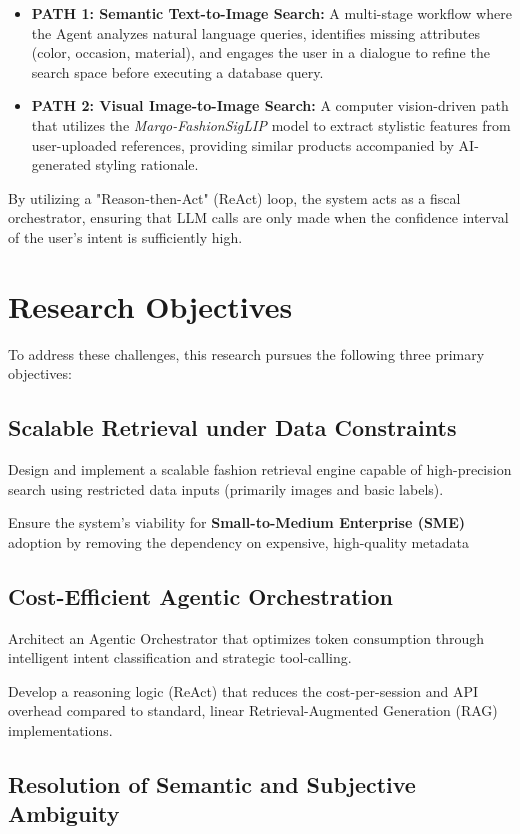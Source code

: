 \begin{itemize}
    \item \textbf{PATH 1: Semantic Text-to-Image Search:} A multi-stage workflow where the Agent analyzes natural language queries, identifies missing attributes (color, occasion, material), and engages the user in a dialogue to refine the search space before executing a database query.
    \item \textbf{PATH 2: Visual Image-to-Image Search:} A computer vision-driven path that utilizes the \textit{Marqo-FashionSigLIP} model to extract stylistic features from user-uploaded references, providing similar products accompanied by AI-generated styling rationale.
\end{itemize}

By utilizing a "Reason-then-Act" (ReAct) loop, the system acts as a fiscal orchestrator, ensuring that LLM calls are only made when the confidence interval of the user's intent is sufficiently high.

\section{Research Objectives}
To address these challenges, this research pursues the following three primary objectives:
\subsection{Scalable Retrieval under Data Constraints}
Design and implement a scalable fashion retrieval engine capable of high-precision search using restricted data inputs (primarily images and basic labels).

Ensure the system's viability for \textbf{Small-to-Medium Enterprise (SME)} adoption by removing the dependency on expensive, high-quality metadata

\subsection{Cost-Efficient Agentic Orchestration}

Architect an Agentic Orchestrator that optimizes token consumption through intelligent intent classification and strategic tool-calling.

Develop a reasoning logic (ReAct) that reduces the cost-per-session and API overhead compared to standard, linear Retrieval-Augmented Generation (RAG) implementations.

\subsection{Resolution of Semantic and Subjective Ambiguity}


